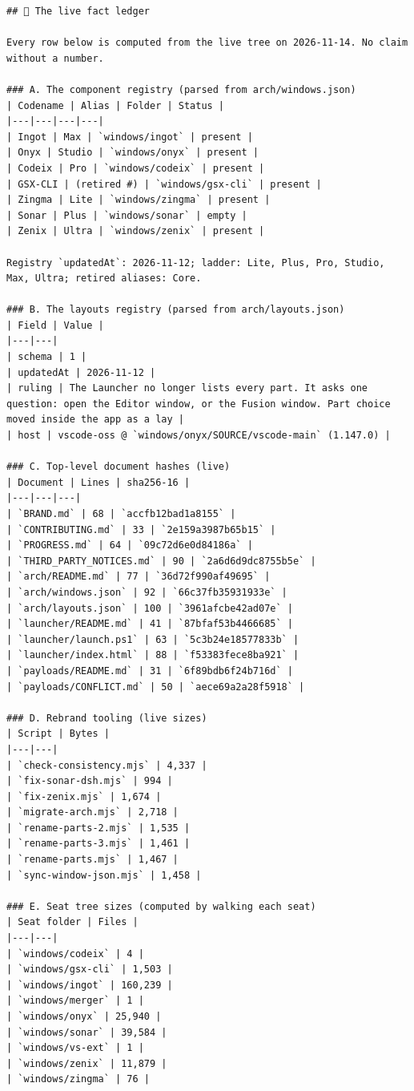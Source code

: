 \begin{Verbatim}[breaklines,breakanywhere,fontsize=\footnotesize]
## 📒 The live fact ledger

Every row below is computed from the live tree on 2026-11-14. No claim without a number.

### A. The component registry (parsed from arch/windows.json)
| Codename | Alias | Folder | Status |
|---|---|---|---|
| Ingot | Max | `windows/ingot` | present |
| Onyx | Studio | `windows/onyx` | present |
| Codeix | Pro | `windows/codeix` | present |
| GSX-CLI | (retired #) | `windows/gsx-cli` | present |
| Zingma | Lite | `windows/zingma` | present |
| Sonar | Plus | `windows/sonar` | empty |
| Zenix | Ultra | `windows/zenix` | present |

Registry `updatedAt`: 2026-11-12; ladder: Lite, Plus, Pro, Studio, Max, Ultra; retired aliases: Core.

### B. The layouts registry (parsed from arch/layouts.json)
| Field | Value |
|---|---|
| schema | 1 |
| updatedAt | 2026-11-12 |
| ruling | The Launcher no longer lists every part. It asks one question: open the Editor window, or the Fusion window. Part choice moved inside the app as a lay |
| host | vscode-oss @ `windows/onyx/SOURCE/vscode-main` (1.147.0) |

### C. Top-level document hashes (live)
| Document | Lines | sha256-16 |
|---|---|---|
| `BRAND.md` | 68 | `accfb12bad1a8155` |
| `CONTRIBUTING.md` | 33 | `2e159a3987b65b15` |
| `PROGRESS.md` | 64 | `09c72d6e0d84186a` |
| `THIRD_PARTY_NOTICES.md` | 90 | `2a6d6d9dc8755b5e` |
| `arch/README.md` | 77 | `36d72f990af49695` |
| `arch/windows.json` | 92 | `66c37fb35931933e` |
| `arch/layouts.json` | 100 | `3961afcbe42ad07e` |
| `launcher/README.md` | 41 | `87bfaf53b4466685` |
| `launcher/launch.ps1` | 63 | `5c3b24e18577833b` |
| `launcher/index.html` | 88 | `f53383fece8ba921` |
| `payloads/README.md` | 31 | `6f89bdb6f24b716d` |
| `payloads/CONFLICT.md` | 50 | `aece69a2a28f5918` |

### D. Rebrand tooling (live sizes)
| Script | Bytes |
|---|---|
| `check-consistency.mjs` | 4,337 |
| `fix-sonar-dsh.mjs` | 994 |
| `fix-zenix.mjs` | 1,674 |
| `migrate-arch.mjs` | 2,718 |
| `rename-parts-2.mjs` | 1,535 |
| `rename-parts-3.mjs` | 1,461 |
| `rename-parts.mjs` | 1,467 |
| `sync-window-json.mjs` | 1,458 |

### E. Seat tree sizes (computed by walking each seat)
| Seat folder | Files |
|---|---|
| `windows/codeix` | 4 |
| `windows/gsx-cli` | 1,503 |
| `windows/ingot` | 160,239 |
| `windows/merger` | 1 |
| `windows/onyx` | 25,940 |
| `windows/sonar` | 39,584 |
| `windows/vs-ext` | 1 |
| `windows/zenix` | 11,879 |
| `windows/zingma` | 76 |


\end{Verbatim}
